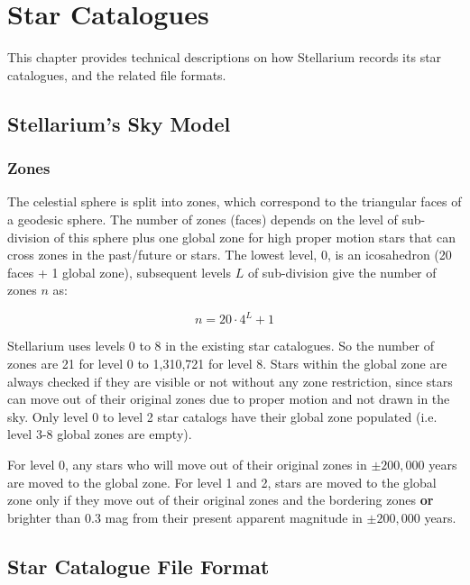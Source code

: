 
\chapter{Star Catalogues}
\label{ch:Catalogues}

This chapter provides technical descriptions on how Stellarium records its star catalogues, and
the related file formats.

\section{Stellarium's Sky Model}
\label{sec:Catalogues:SkyModel}

\subsection{Zones}
\label{sec:Catalogues:SkyModel:Zones}

The celestial sphere is split into zones, which correspond to the
triangular faces of a geodesic sphere. The number of zones (faces)
depends on the level of sub-division of this sphere plus one global zone for 
high proper motion stars that can cross zones in the past/future or stars. The lowest level,
0, is an icosahedron (20 faces + 1 global zone), subsequent levels $L$ of sub-division
give the number of zones $n$ as:

\begin{equation}
n=20 \cdot 4^L + 1
\end{equation}

Stellarium uses levels 0 to 8 in the existing star catalogues. So the number of zones are 21 for level 0 to 1,310,721 for level 8.
Stars within the global zone are always checked if they are visible or not without any zone restriction, since stars can move 
out of their original zones due to proper motion and not drawn in the sky. Only level 0 to level 2 star catalogs have their global 
zone populated (i.e. level 3-8 global zones are empty).

For level 0, any stars who will move out of their original zones in $\pm 200,000$ years are moved to the global zone. For level 1 and 2, stars are moved 
to the global zone only if they move out of their original zones and the bordering zones \textbf{or} brighter than 0.3 mag from their 
present apparent magnitude in $\pm 200,000$ years.

\section{Star Catalogue File Format}%
\label{sec:Catalogues:stars}

